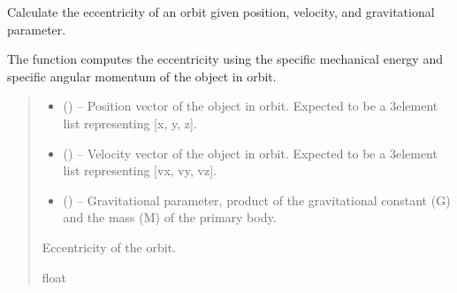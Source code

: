 \documentclass[letterpaper,10pt,english]{sphinxmanual}
\begin{document}
\begin{fulllineitems}
\label{\detokenize{fspsim.utils:fspsim.utils.Conversions.calculate_eccentricity}}
\pysigstartsignatures
{}
\pysigstopsignatures
\sphinxAtStartPar
Calculate the eccentricity of an orbit given position, velocity, and gravitational parameter.

\sphinxAtStartPar
The function computes the eccentricity using the specific mechanical energy and specific angular momentum
of the object in orbit.
\begin{quote}\begin{description}
\begin{itemize}
\item {} 
\sphinxAtStartPar
{} (\sphinxstyleliteralemphasis{\sphinxupquote{{[}}}\sphinxstyleliteralemphasis{\sphinxupquote{{]}}}) – Position vector of the object in orbit. Expected to be a 3\sphinxhyphen{}element list representing {[}x, y, z{]}.

\item {} 
\sphinxAtStartPar
{} (\sphinxstyleliteralemphasis{\sphinxupquote{{[}}}\sphinxstyleliteralemphasis{\sphinxupquote{{]}}}) – Velocity vector of the object in orbit. Expected to be a 3\sphinxhyphen{}element list representing {[}vx, vy, vz{]}.

\item {} 
\sphinxAtStartPar
{} () – Gravitational parameter, product of the gravitational constant (G) and the mass (M) of the primary body.

\end{itemize}

\sphinxAtStartPar
Eccentricity of the orbit.

\sphinxAtStartPar
float

\end{description}\end{quote}

\end{fulllineitems}
\end{document}
